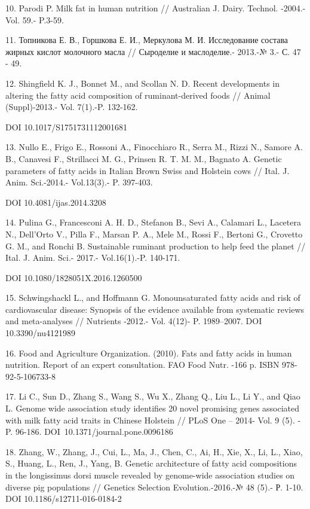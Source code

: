 10. Parodi P. Milk fat in human nutrition // Australian J. Dairy.
Technol. -2004.-Vol. 59.- P.3-59.

11. Топникова Е. В., Горшкова Е. И., Меркулова М. И. Исследование
состава жирных кислот молочного масла // Сыроделие и маслоделие.-
2013.-№ 3.- С. 47 - 49.

12. Shingfield K. J., Bonnet M., and Scollan N. D. Recent developments
in altering the fatty acid composition of ruminant-derived foods //
Animal (Suppl)-2013.- Vol. 7(1).-P. 132-162.

DOI 10.1017/S1751731112001681

13. Nullo E., Frigo E., Rossoni A., Finocchiaro R., Serra M., Rizzi N.,
Samore A. B., Canavesi F., Strillacci M. G., Prinsen R. T. M. M.,
Bagnato A. Genetic parameters of fatty acids in Italian Brown Swiss and
Holstein cows // Ital. J. Anim. Sci.-2014.- Vol.13(3).- P. 397-403.

DOI 10.4081/ijas.2014.3208

14. Pulina G., Francesconi A. H. D., Stefanon B., Sevi A., Calamari L.,
Lacetera N., Dell'Orto V., Pilla F., Marsan P. A., Mele M., Rossi F.,
Bertoni G., Crovetto G. M., and Ronchi B. Sustainable ruminant
production to help feed the planet // Ital. J. Anim. Sci.- 2017.-
Vol.16(1).-P. 140-171.

DOI 10.1080/1828051X.2016.1260500

15. Schwingshackl L., and Hoffmann G. Monounsaturated fatty acids and
risk of cardiovascular disease: Synopsis of the evidence available from
systematic reviews and meta-analyses // Nutrients -2012.- Vol. 4(12)- P.
1989--2007. DOI 10.3390/nu4121989

16. Food and Agriculture Organization. (2010). Fats and fatty acids in
human nutrition. Report of an expert consultation. FAO Food Nutr. -166
p. ISBN 978-92-5-106733-8

17. Li C., Sun D., Zhang S., Wang S., Wu X., Zhang Q., Liu L., Li Y.,
and Qiao L. Genome wide association study identifies 20 novel promising
genes associated with milk fatty acid traits in Chinese Holstein // PLoS
One -- 2014- Vol. 9 (5). - P. 96-186. DOI~10.1371/journal.pone.0096186

18. Zhang, W., Zhang, J., Cui, L., Ma, J., Chen, C., Ai, H., Xie, X.,
Li, L., Xiao, S., Huang, L., Ren, J., Yang, B. Genetic architecture of
fatty acid compositions in the longissimus dorsi muscle revealed by
genome-wide association studies on diverse pig populations // Genetics
Selection Evolution.-2016.-№ 48 (5).- Р. 1-10. DOI
10.1186/s12711-016-0184-2

